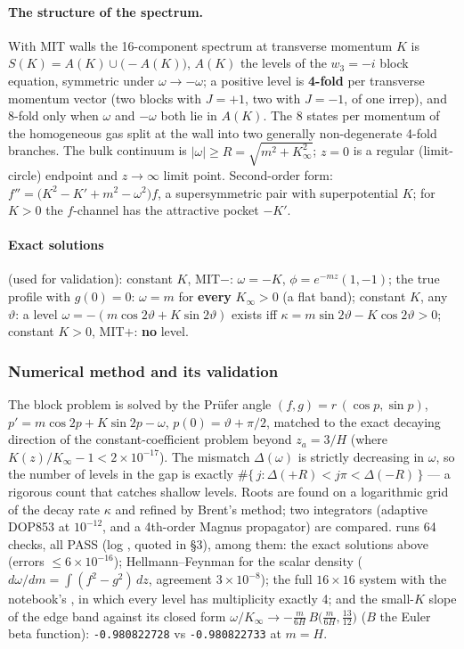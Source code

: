 \paragraph{The structure of the spectrum.} With MIT walls the 16-component spectrum at transverse momentum
$K$ is $S(K)=A(K)\cup\bigl(-A(K)\bigr)$, $A(K)$ the levels of the $w_3=-i$ block equation, symmetric under
$\omega\to-\omega$; a positive level is \textbf{4-fold} per transverse momentum vector (two blocks with
$J=+1$, two with $J=-1$, of one irrep), and 8-fold only when $\omega$ and $-\omega$ both lie in $A(K)$. The
8 states per momentum of the homogeneous gas split at the wall into two generally non-degenerate 4-fold
branches. The bulk continuum is $|\omega|\geq R=\sqrt{m^2+K_\infty^2}$; $z=0$ is a regular (limit-circle)
endpoint and $z\to\infty$ limit point. Second-order form: $f''=\bigl(K^2-K'+m^2-\omega^2\bigr)f$, a
supersymmetric pair with superpotential $K$; for $K>0$ the $f$-channel has the attractive pocket $-K'$.

\paragraph{Exact solutions} (used for validation): constant $K$, MIT$-$: $\omega=-K$, $\phi=e^{-mz}(1,-1)$;
the true profile with $g(0)=0$: $\omega=m$ for \textbf{every} $K_\infty>0$ (a flat band); constant $K$, any
$\vartheta$: a level $\omega=-(m\cos2\vartheta+K\sin2\vartheta)$ exists iff
$\kappa=m\sin2\vartheta-K\cos2\vartheta>0$; constant $K>0$, MIT$+$: \textbf{no} level.

\subsubsection[{Numerical method and its validation [WG 3, WG 5]}]{Numerical method and its validation }
\label{sec:4.6.4}

The block problem is solved by the Pr\"ufer angle $(f,g)=r\,(\cos p,\sin p)$,
$p'=m\cos2p+K\sin2p-\omega$, $p(0)=\vartheta+\pi/2$, matched to the exact decaying direction of the
constant-coefficient problem beyond $z_a=3/H$ (where $K(z)/K_\infty-1<2\times10^{-17}$). The mismatch
$\Delta(\omega)$ is strictly decreasing in $\omega$, so the number of levels in the gap is exactly
$\#\{\,j:\Delta(+R)<j\pi<\Delta(-R)\,\}$ --- a rigorous count that catches shallow levels. Roots are found on
a logarithmic grid of the decay rate $\kappa$ and refined by Brent's method; two integrators (adaptive
DOP853 at $10^{-12}$, and a 4th-order Magnus propagator) are compared. 
runs 64 checks, all PASS (log , quoted in 
\S3), among them: the exact solutions above (errors $\leq6\times10^{-16}$); Hellmann--Feynman for the scalar
density ($d\omega/dm=\int(f^2-g^2)\,dz$, agreement $3\times10^{-8}$); the full $16\times16$ system with the
notebook's , in which every level has multiplicity exactly 4; and the small-$K$ slope of the
edge band against its closed form $\omega/K_\infty\to-\frac{m}{6H}\,B\bigl(\frac{m}{6H},\frac{13}{12}\bigr)$ ($B$
the Euler beta function): \texttt{-0.980822728} vs \texttt{-0.980822733} at $m=H$.

